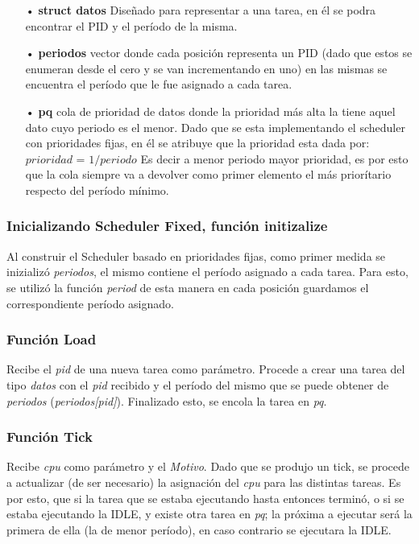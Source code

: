 \documentclass[a4paper]{article}
\begin{document}
	\begin{itemize}
	\item[•]\textbf{struct datos} Diseñado para representar a una tarea, en él se podra encontrar el PID y el período de la misma.
	\item[•]\textbf{periodos} vector donde cada posición representa un PID (dado que estos se enumeran desde el cero y se van incrementando en uno) en las mismas se encuentra el período que le fue asignado a cada tarea.
	\item[•]\textbf{pq} cola de prioridad de datos donde la prioridad más alta la tiene aquel dato cuyo periodo es el menor. Dado que se esta implementando el scheduler con prioridades fijas, en él se atribuye que la prioridad esta dada por:\newline
	$prioridad$ = $1 / periodo$ \newline 
	Es decir a menor periodo mayor prioridad, es por esto que la cola siempre va a devolver como primer elemento el más priorítario respecto del per\'iodo m\'inimo.
	\end{itemize}	
	
		
\subsubsection*{Inicializando Scheduler Fixed, función initizalize}		

Al construir el Scheduler basado en prioridades fijas, como primer medida se inizializó \emph{periodos}, el mismo contiene el per\'iodo asignado a cada tarea. Para esto, se utilizó la función \emph{period} de esta manera en cada posición guardamos el correspondiente per\'iodo asignado.

\subsubsection*{Funci\'on Load}

Recibe el \emph{pid} de una nueva tarea como par\'ametro. Procede a crear una tarea del tipo \emph{datos} con el \emph{pid} recibido y el per\'iodo del mismo que se puede obtener de \emph{periodos} (\emph{periodos[pid]}). Finalizado esto, se encola la tarea en \emph{pq}.

\subsubsection*{Funci\'on Tick}	

Recibe \emph{cpu} como par\'ametro y el \emph{Motivo}. Dado que se produjo un tick, se procede a actualizar (de ser necesario) la asignación del \emph{cpu} para las distintas tareas.  Es por esto, que si la tarea que se estaba ejecutando hasta entonces terminó, o si se estaba ejecutando la IDLE, y existe otra tarea en \emph{pq}; la próxima a ejecutar será la primera de ella (la de menor período), en caso contrario se ejecutara la IDLE. 
\end{document}
